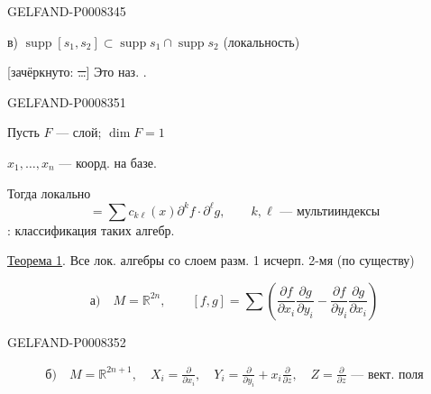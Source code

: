 \begin{GelfandAdjacentEvidence}{GELFAND-P000834}{5}


в) \(\operatorname{supp}[s_1,s_2]\subset
\operatorname{supp}s_1\cap\operatorname{supp}s_2\)
\qquad (локальность)

[зачёркнуто: \sout{…}] Это наз. .
\end{GelfandAdjacentEvidence}



\begin{GelfandAdjacentEvidence}{GELFAND-P000835}{1}

Пусть \(F\) — слой; \(\dim F=1\)

\(x_1,\ldots,x_n\) — коорд. на базе.

Тогда локально
\begin{equation*}
[f,g]=\sum c_{k\ell}(x)\partial^k f\cdot\partial^\ell g,
\qquad k,\ell\text{ — мультииндексы}
\tag{1}
\end{equation*}
: классификация таких алгебр.

\uline{Теорема 1}. Все лок. алгебры со слоем разм. 1 исчерп. 2-мя (по существу)

\begin{equation*}
\text{а)}\quad M=\mathbb R^{2n},\qquad
[f,g]=\sum\left(\frac{\partial f}{\partial x_i}\frac{\partial g}{\partial y_i}
-\frac{\partial f}{\partial y_i}\frac{\partial g}{\partial x_i}\right)
\tag{2}
\end{equation*}
\end{GelfandAdjacentEvidence}
\begin{GelfandAdjacentEvidence}{GELFAND-P000835}{2}


\begin{equation*}
\begin{gathered}
\text{б)}\quad M=\mathbb R^{2n+1},\quad
X_i=\frac{\partial}{\partial x_i},\quad
Y_i=\frac{\partial}{\partial y_i}+x_i\frac{\partial}{\partial z},\quad
Z=\frac{\partial}{\partial z}\text{ — вект. поля}
\end{gathered}
\tag{3}
\end{equation*}
\end{GelfandAdjacentEvidence}
